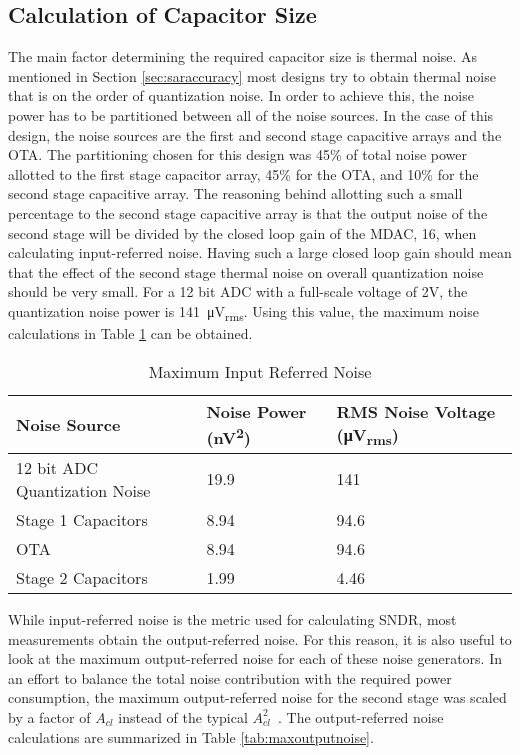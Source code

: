 \subsection{Calculation of Capacitor Size}
The main factor determining the required capacitor size is thermal noise. As mentioned in Section \ref{sec:saraccuracy} most designs try to obtain thermal noise that is on the order of quantization noise. In order to achieve this, the noise power has to be partitioned between all of the noise sources. In the case of this design, the noise sources are the first and second stage capacitive arrays and the OTA. The partitioning chosen for this design was 45\% of total noise power allotted to the first stage capacitor array, 45\% for the OTA, and 10\% for the second stage capacitive array. The reasoning behind allotting such a small percentage to the second stage capacitive array is that the output noise of the second stage will be divided by the closed loop gain of the MDAC, 16, when calculating input-referred noise. Having such a large closed loop gain should mean that the effect of the second stage thermal noise on overall quantization noise should be very small. For a 12 bit ADC with a full-scale voltage of 2V, the quantization noise power is \SI{141}{\micro\volt_{rms}}. Using this value, the maximum noise calculations in Table \ref{tab:maxinputnoise} can be obtained.
\begin{table}[htbp]
\centering
\begin{tabularx}{\linewidth}{|X|l|X|}
\hline
Noise Source & Noise Power (\si{\square\nano\volt}) & RMS Noise Voltage (\si{\micro\volt_{rms}}) \\ \hline
12 bit ADC Quantization Noise & 19.9 & 141 \\ \hline
Stage 1 Capacitors & 8.94 & 94.6 \\ \hline
OTA & 8.94 & 94.6 \\ \hline
Stage 2 Capacitors & 1.99 & 4.46 \\ \hline
\end{tabularx}
\caption{Maximum Input Referred Noise}
\label{tab:maxinputnoise}
\end{table}
While input-referred noise is the metric used for calculating SNDR, most measurements obtain the output-referred noise. For this reason, it is also useful to look at the maximum output-referred noise for each of these noise generators. In an effort to balance the total noise contribution with the required power consumption, the maximum output-referred noise for the second stage was scaled by a factor of $A_{cl}$ instead of the typical $A_{cl}^{2}$~\cite{315breader}. The output-referred noise calculations are summarized in Table \ref{tab:maxoutputnoise}. 
